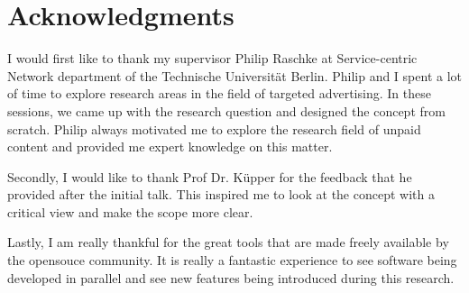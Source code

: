 \chapter*{Acknowledgments}
\label{cha:acknowledgments}

I would first like to thank my supervisor Philip Raschke at Service-centric Network department of the Technische Universität Berlin. Philip and I spent a lot of time to explore research areas in the field of targeted advertising. In these sessions, we came up with the research question and designed the concept from scratch. Philip always motivated me to explore the research field of unpaid content and provided me expert knowledge on this matter. 

Secondly, I would like to thank Prof Dr. Küpper for the feedback that he provided after the initial talk. This inspired me to look at the concept with a critical view and make the scope more clear.

Lastly, I am really thankful for the great tools that are made freely available by the opensouce community. It is really a fantastic experience to see software being developed in parallel and see new features being introduced during this research. 